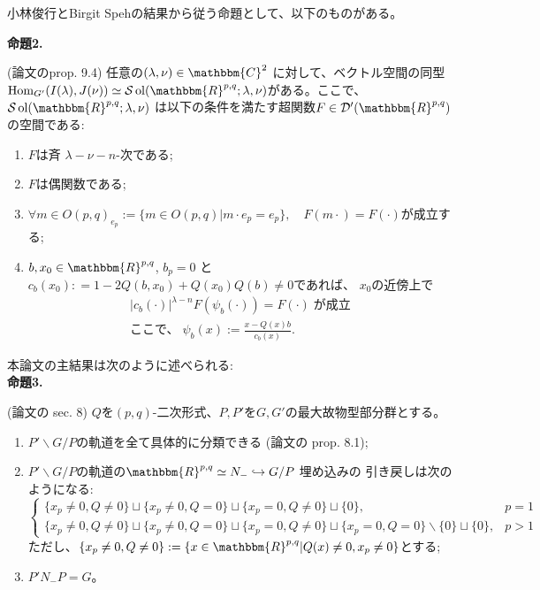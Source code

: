 \documentclass[a4paper,10pt]{article} %
\newcommand{\assign}{:=}
\newcommand{\tmop}[1]{\ensuremath{\operatorname{#1}}}
\newcommand{\tmtextbf}[1]{{\bfseries{#1}}}
\newcommand{\tmtextit}[1]{{\itshape{#1}}}
\begin{document}
{\noindent}小林俊行とBirgit Spehの結果から従う命題として、以下のものがある。

{\noindent}\textbf{命題\textbf{2}.}\tmtextit{(論文のprop. 9.4)
任意の$( \lambda, \nu) \in \mathbbm{C}^2$ に対して、ベクトル空間の同型 $\tmop{Hom}_{G'} ( I (
\lambda), J ( \nu)) \simeq \mathcal{S} \tmop{ol} ( \mathbbm{R}^{p, q} ;
\lambda, \nu)$がある。ここで、$\mathcal{S} \tmop{ol} ( \mathbbm{R}^{p, q} ; \lambda,
\nu)$ は以下の条件を満たす超関数$F \in \mathcal{D}' (
\mathbbm{R}^{p, q})$の空間である:
\begin{enumerate}
 \item $F$は斉 $\lambda-\nu-n$-次である;
 \item $F$は偶関数である;
\item $\forall m \in O ( p, q)_{e_p} \assign \{ m \in O ( p, q) | m \cdot e_p = e_p \},\quad F ( m \cdot) = F ( \cdot)$が成立する;
 \item $b, x_0 \in \mathbbm{R}^{p, q}$, $b_p = 0$ と $c_b
 ( x_0) : = 1 - 2 Q ( b, x_0) + Q ( x_0) Q ( b) \neq 0$であれば、 $x_0$の近傍上で
\begin{eqnarray}
& | c_b ( \cdot) |^{\lambda - n} F ( \psi_b ( \cdot)) = F (\cdot)
\;　\mbox{が成立}& \nonumber\\
& \mbox{ここで、}\;\psi_b ( x) \assign \frac{x - Q (x) b}{c_b ( x)} . & \nonumber
\end{eqnarray}
\end{enumerate}}

{\noindent}本論文の主結果は次のように述べられる:\\

{\noindent}\tmtextbf{命題\textbf{3}.}\tmtextit{(論文の sec. 8)
$Q$を$(p,q)$-二次形式、$P,P'$を$G,G'$の最大故物型部分群とする。
\begin{enumerate}
 \item $P' \backslash G/ P$の軌道を全て具体的に分類できる (論文の
prop. 8.1);
 \item $P' \backslash G/P$の軌道の$\mathbbm{R}^{p, q} \simeq N_- \hookrightarrow G / P$ 埋め込みの
引き戻しは次のようになる:
 \[ \left\{ \begin{array}{ll}
 \{ x_p \neq 0, Q \neq 0 \} \sqcup \{ x_p \neq 0, Q = 0 \} \sqcup \{ x_p
 = 0, Q \neq 0 \} \sqcup \{ 0 \}, & p = 1\\
 \{ x_p \neq 0, Q \neq 0 \} \sqcup \{ x_p \neq 0, Q = 0 \} \sqcup \{ x_p
 = 0, Q \neq 0 \} \sqcup \{ x_p = 0, Q = 0 \} \backslash \{ 0 \} \sqcup
 \{ 0 \}, & p > 1
 \end{array} \right. \]
 ただし、$\{ x_p \neq 0, Q \neq 0 \} \assign \{ x \in \mathbbm{R}^{p, q} |
 Q ( x) \neq 0, x_p \neq 0 \}$とする;
 
 \item $P' N_- P = G$。
\end{enumerate}}
\end{document}
